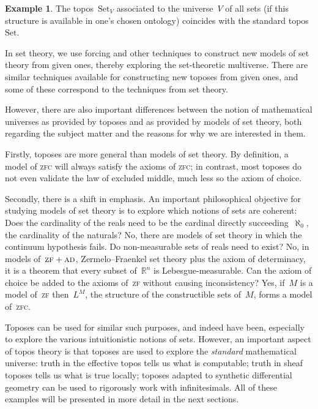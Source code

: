 \documentclass[oneside,reqno]{amsart}
\theoremstyle{definition}
\newtheorem{ex}[defn]{Example}
\theoremstyle{plain}
\theoremstyle{remark}
\newcommand{\RR}{\mathbb{R}}
\newcommand{\Set}{\mathrm{Set}}
\renewcommand{\_}{\mathpunct{.}\,}
\newcommand{\effective}{ef{}fective\xspace}
\newcommand{\?}{\,{:}\,}
\begin{document}
\begin{ex}The topos~$\Set_V$ associated to the universe~$V$ of all sets (if
this structure is available in one's chosen ontology) coincides with the
standard topos~$\Set$.\end{ex}

In set theory, we use forcing and other techniques to construct new
models of set theory from given ones, thereby exploring the set-theoretic
multiverse. There are similar techniques available for constructing new toposes
from given ones, and some of these correspond to the techniques from set
theory.

However, there are also important differences between the notion of mathematical
universes as provided by toposes and as provided by models of set theory, both
regarding the subject matter and the reasons for why we are interested in them.

Firstly, toposes are more general than models of set theory. By definition, a
model of \textsc{zfc} will always satisfy the axioms of \textsc{zfc}; in
contrast, most toposes do not even validate the law of excluded middle, much
less so the axiom of choice.

Secondly, there is a shift in emphasis. An important philosophical objective
for studying models of set theory is to explore which notions of sets are
coherent: Does the cardinality of the reals need to be the cardinal directly
succeeding~$\aleph_0$, the cardinality of the naturals? No, there are models of
set theory in which the continuum hypothesis fails. Do non-measurable sets of
reals need to exist? No, in models of~$\textsc{zf}+\textsc{ad}$,
Zermelo--Fraenkel set theory plus the axiom of determinacy, it is a theorem that
every subset of~$\RR^n$ is Lebesgue-measurable. Can the axiom of choice be
added to the axioms of~\textsc{zf} without causing inconsistency? Yes, if~$M$
is a model of~\textsc{zf} then~$L^M$, the structure of the constructible sets of~$M$, forms a
model of~\textsc{zfc}.

Toposes can be used for similar such purposes, and indeed have been,
especially to explore the various intuitionistic notions of sets. However, an important
aspect of topos theory is that toposes are used to explore the \emph{standard}
mathematical universe: truth in the \effective topos tells us what is
computable; truth in sheaf toposes tells us what is true locally; toposes
adapted to synthetic differential geometry can be used to rigorously work with
infinitesimals. All of these examples will be presented in more detail in the
next sections.
\end{document}
